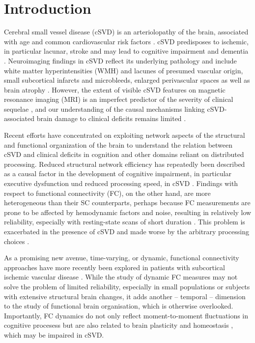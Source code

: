 \section{Introduction} \label{intro}
Cerebral small vessel disease (cSVD) is an arteriolopathy of the brain, associated with age and common cardiovascular risk factors \citep{Wardlaw2013-yd}.
cSVD predisposes to ischemic, in particular lacunar, stroke and may lead to cognitive impairment and dementia \citep{Cannistraro2019-ly}.
Neuroimaging findings in cSVD reflect its underlying pathology \citep{Wardlaw2015-ri} and include white matter hyperintensities (WMH) and lacunes of presumed vascular origin, small subcortical infarcts and microbleeds, enlarged perivascular spaces as well as brain atrophy \citep{Wardlaw2013-sc}.
However, the extent of visible cSVD features on magnetic resonance imaging (MRI) is an imperfect predictor of the severity of clinical sequelae \citep{Das2019-pc}, and our understanding of the causal mechanisms linking cSVD-associated brain damage to clinical deficits remains limited \citep{Bos2018-qj}.

Recent efforts have concentrated on exploiting network aspects of the structural \citep{Tuladhar2016-ae,Tuladhar2020-fp,Lawrence2018-ti} and functional \citep{Dey2016-qg,Schulz2021-ho} organization of the brain to understand the relation between cSVD and clinical deficits in cognition and other domains reliant on distributed processing.
Reduced structural network efficiency has repeatedly been described as a causal factor in the development of cognitive impairment, in particular executive dysfunction und reduced processing speed, in cSVD \citep{Lawrence2014-xp,Shen2020-yv,Reijmer2016-wm,Prins2005-ej}.
Findings with respect to functional connectivity (FC), on the other hand, are more heterogeneous than their SC counterparts, perhaps because FC measurements are prone to be affected by hemodynamic factors and noise, resulting in relatively low reliability, especially with resting-state scans of short duration \citep{laumann2015functional}. 
This problem is exacerbated in the presence of cSVD and made worse by the arbitrary processing choices \citep{Lawrence2018-sv,Gesierich2020-db}.

As a promising new avenue, time-varying, or dynamic, functional connectivity approaches have more recently been explored in patients with subcortical ischemic vascular disease \citep{Yin2022-cv,Xu2021-ib}. 
While the study of dynamic FC measures may not solve the problem of limited reliability, especially in small populations or subjects with extensive structural brain changes, it adds another -- temporal -- dimension to the study of functional brain organisation, which is otherwise overlooked.
Importantly, FC dynamics do not only reflect moment-to-moment fluctuations in cognitive procesess but are also related to brain plasticity and homeostasis , which may be impaired in cSVD.

